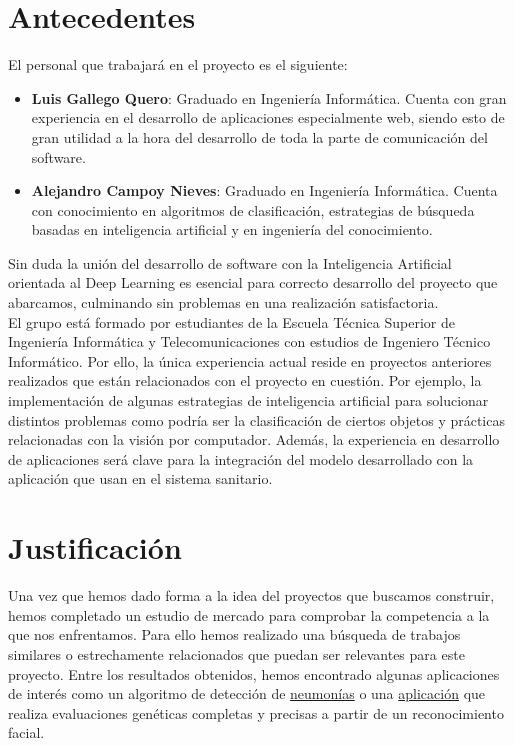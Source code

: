 \section{Antecedentes}

El personal que trabajará en el proyecto es el siguiente:
\begin{itemize}
	\item \textbf{Luis Gallego Quero}: Graduado en Ingeniería Informática. Cuenta con gran experiencia en el desarrollo de aplicaciones especialmente web, siendo esto de gran utilidad a la hora del desarrollo de toda la parte de comunicación del software.
	\item \textbf{Alejandro Campoy Nieves}:  Graduado en Ingeniería Informática. Cuenta con conocimiento en algoritmos de clasificación, estrategias de búsqueda basadas en inteligencia artificial y en ingeniería del conocimiento.
\end{itemize}

Sin duda la unión del desarrollo de software con la Inteligencia Artificial orientada al Deep Learning es esencial para correcto desarrollo del proyecto que abarcamos, culminando sin problemas en una realización satisfactoria. \\

El grupo está formado por estudiantes de la Escuela Técnica Superior de Ingeniería Informática y Telecomunicaciones con estudios de Ingeniero Técnico Informático. Por ello, la única experiencia actual reside en proyectos anteriores realizados que están relacionados con el proyecto en cuestión. Por ejemplo, la implementación de algunas estrategias de inteligencia artificial para solucionar distintos problemas como podría ser la clasificación de ciertos objetos y prácticas relacionadas con la visión por computador. Además, la experiencia en desarrollo de aplicaciones será clave para la integración del modelo desarrollado con la aplicación que usan en el sistema sanitario.

\section{Justificación}

Una vez que hemos dado forma a la idea del proyectos que buscamos construir, hemos completado un estudio de mercado para comprobar la competencia a la que nos enfrentamos. Para ello hemos realizado una búsqueda de trabajos similares o estrechamente relacionados que puedan ser relevantes para este proyecto. Entre los resultados obtenidos, hemos encontrado algunas aplicaciones de interés como un algoritmo de detección de \href{https://blogthinkbig.com/este-algoritmo-diagnostica-neumonia-con-la-precision-de-un-medico}{neumonías} \cite{article:neumonia} o una \href{https://www.face2gene.com/}{aplicación} \cite{misc:face2gene} que realiza evaluaciones genéticas completas y precisas a partir de un reconocimiento facial. \\

